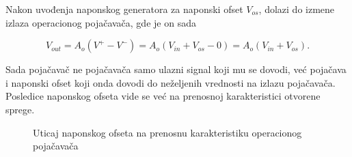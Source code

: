 {Nakon uvođenja naponskog generatora za naponski ofset $V_{os}$, dolazi do izmene izlaza operacionog pojačavača, gde je on sada}

\begin{equation}
    V_{out} = A_o(V^+ - V^-) = A_o(V_{in} + V_{os} - 0) = A_o(V_{in} + V_{os}).
\end{equation}

{Sada pojačavač ne pojačavača samo ulazni signal koji mu se dovodi, već pojačava i naponski ofset koji onda dovodi do neželjenih vrednosti na izlazu pojačavača. Posledice naponskog ofseta vide se već na prenosnoj karakteristici otvorene sprege.}

\begin{figure}[H]
    \centering

    \caption{Uticaj naponskog ofseta na prenosnu
    karakteristiku operacionog pojačavača}
    \label{fig:opamp_ofset_transfer}
\end{figure}

